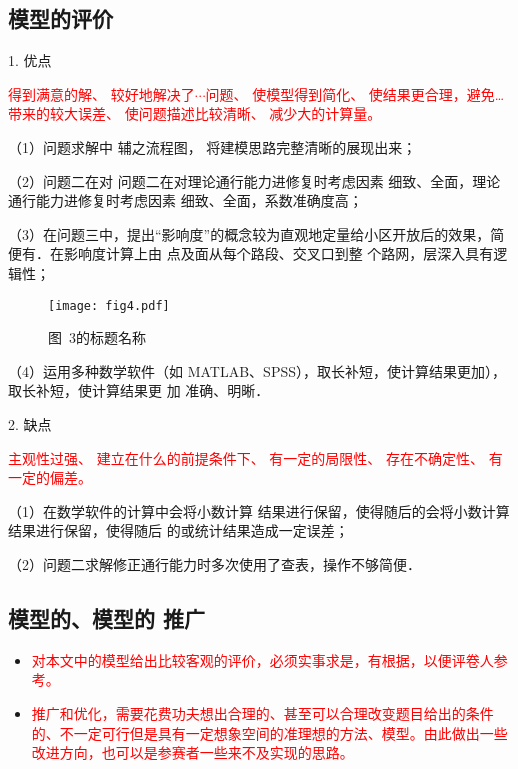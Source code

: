 \documentclass[12pt,a4paper]{nmmcm}
\begin{document}
\subsection{模型的评价}


1. 优点

\textcolor{red}{得到满意的解、
较好地解决了$\cdots$问题、
使模型得到简化、
使结果更合理，避免…带来的较大误差、
使问题描述比较清晰、
减少大的计算量。
}

（1）问题求解中 辅之流程图， 将建模思路完整清晰的展现出来；

（2）问题二在对 问题二在对理论通行能力进修复时考虑因素 细致、全面，理论通行能力进修复时考虑因素
 细致、全面，系数准确度高；

（3）在问题三中，提出“影响度”的概念较为直观地定量给小区开放后的效果，简便有．在影响度计算上由
点及面从每个路段、交叉口到整 个路网，层深入具有逻辑性；

\begin{figure}[h!t]
\centerline{\texttt{[image: fig4.pdf]}}
\caption{\song\wuhao 图~3的标题名称}
\end{figure}


（4）运用多种数学软件（如 MATLAB、SPSS），取长补短，使计算结果更加），取长补短，使计算结果更
加 准确、明晰．

2. 缺点

\textcolor{red}{主观性过强、
建立在什么的前提条件下、
有一定的局限性、
存在不确定性、
有一定的偏差。
}

（1）在数学软件的计算中会将小数计算 结果进行保留，使得随后的会将小数计算 结果进行保留，使得随后
的或统计结果造成一定误差；

（2）问题二求解修正通行能力时多次使用了查表，操作不够简便．

\subsection{模型的、模型的 推广}

\begin{itemize}

\item \textcolor{red}{对本文中的模型给出比较客观的评价，必须实事求是，有根据，以便评卷人参考。}

\item \textcolor{red}{推广和优化，需要花费功夫想出合理的、甚至可以合理改变题目给出的条件的、不一定可行但是具有一定想象空间的准理想的方法、模型。由此做出一些改进方向，也可以是参赛者一些来不及实现的思路。}
\end{itemize}
\end{document}
